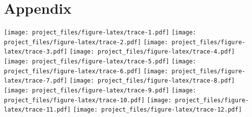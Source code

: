 \documentclass[
]{article}
\begin{document}
\hypertarget{appendix}{%
\section{Appendix}\label{appendix}}

\texttt{[image: project\_files/figure-latex/trace-1.pdf]}
\texttt{[image: project\_files/figure-latex/trace-2.pdf]}
\texttt{[image: project\_files/figure-latex/trace-3.pdf]}
\texttt{[image: project\_files/figure-latex/trace-4.pdf]}
\texttt{[image: project\_files/figure-latex/trace-5.pdf]}
\texttt{[image: project\_files/figure-latex/trace-6.pdf]}
\texttt{[image: project\_files/figure-latex/trace-7.pdf]}
\texttt{[image: project\_files/figure-latex/trace-8.pdf]}
\texttt{[image: project\_files/figure-latex/trace-9.pdf]}
\texttt{[image: project\_files/figure-latex/trace-10.pdf]}
\texttt{[image: project\_files/figure-latex/trace-11.pdf]}
\texttt{[image: project\_files/figure-latex/trace-12.pdf]}
\end{document}
